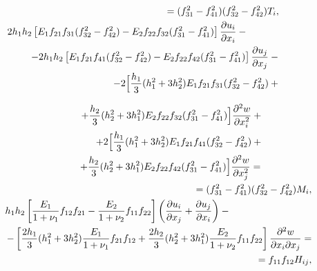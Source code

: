 \begin{equation}
\begin{aligned}
=(f_{31}^{2} -f_{41}^{2} )(f_{32}^{2} -f_{42}^{2} )T_{i} , \phantom{~~~~~~~~~} 

\\

 2h_{1} h_{2} \left[E_{1} f_{21} f_{31} (f_{32}^{2} -f_{42}^{2} )-E_{2} f_{22} f_{32} (f_{31}^{2} -f_{41}^{2} )\right]\frac{\partial u_{i} }{\partial x_{i} } - \phantom{~~~~~~~~~~~~~~~~~~~}\\

-2h_{1} h_{2} \left[E_{1} f_{21} f_{41} (f_{32}^{2} -f_{42}^{2} )-E_{2} f_{22} f_{42} (f_{31}^{2} -f_{41}^{2} )\right]\frac{\partial u_{j} }{\partial x_{j} } - \phantom{~~~~~~~~~}  \\

-2\Bigl[\frac{h_{1} }{3}(h_{1}^{2} +3h_{2}^{2})E_{1}f_{21}f_{31}(f_{32}^{2}-f_{42}^{2})+ \phantom{~~~~~~~~~}  \\

\end{aligned}

\end{equation}



\begin{equation}

\begin{aligned}

+

\frac{h_{2}}{3}(h_{2}^{2}+3h_{1}^{2})E_{2}f_{22}f_{32}(f_{31}^{2}-f_{41}^{2})\Bigr] \frac{\partial ^{2} w}{\partial x_{i}^{2} } + \phantom{~~~~~~~~~~~~~~~} 

 \\

+2\Bigl[\frac{h_{1} }{3}(h_{1}^{2}+3h_{2}^{2})E_{1}f_{21}f_{41}(f_{32}^{2} -f_{42}^{2} )+ \phantom{~~~~~~~~~~~~~~~} \\ +\frac{h_{2} }{3} (h_{2}^{2} +3h_{1}^{2} )E_{2} f_{22} f_{42} (f_{31}^{2} -f_{41}^{2} )\Bigr] \frac{\partial ^{2} w}{\partial x_{j}^{2} } = \phantom{~~~~~~~~~~~~~~~} \\

 = (f_{31}^{2} -f_{41}^{2} )(f_{32}^{2} -f_{42}^{2} )M_{i}, \\

h_{1} h_{2} \left[\frac{E_{1} }{1+\nu _{1} } f_{12} f_{21} -\frac{E_{2} }{1+\nu _{2} } f_{11} f_{22} \right] \left(\frac{\partial u_{i} }{\partial x_{j} } +\frac{\partial u_{j} }{\partial x_{i} } \right)- \phantom{~~~~~~~~~~~~~~~~~~~~~~~~~}\\

-\left[\frac{2h_{1} }{3} (h_{1}^{2} +3h_{2}^{2} )\frac{E_{1} }{1+\nu _{1} } f_{21} f_{12} +\frac{2h_{2} }{3} (h_{2}^{2} +3h_{1}^{2} )\frac{E_{2} }{1+\nu _{2} } f_{11} f_{22} \right] \frac{\partial ^{2} w}{\partial x_{i} \partial x_{j} } = \\

=f_{11} f_{12} H_{ij},

\end{aligned}

\end{equation}

